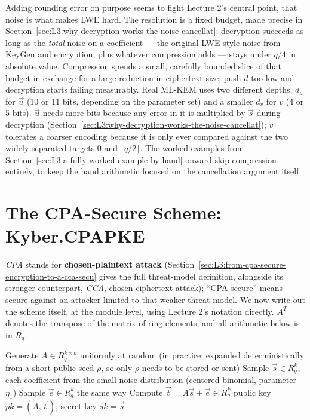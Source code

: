 Adding rounding error on purpose seems to fight Lecture 2's central point, that noise is what makes LWE hard. The resolution is a fixed budget, made precise in Section~\ref{sec:L3:why-decryption-works-the-noise-cancellat}: decryption succeeds as long as the \emph{total} noise on a coefficient --- the original LWE-style noise from KeyGen and encryption, plus whatever compression adds --- stays under $q/4$ in absolute value. Compression spends a small, carefully bounded slice of that budget in exchange for a large reduction in ciphertext size; push $d$ too low and decryption starts failing measurably. Real ML-KEM uses two different depths: $d_u$ for $\vec u$ (10 or 11 bits, depending on the parameter set) and a smaller $d_v$ for $v$ (4 or 5 bits). $\vec u$ needs more bits because any error in it is multiplied by $\vec s$ during decryption (Section~\ref{sec:L3:why-decryption-works-the-noise-cancellat}); $v$ tolerates a coarser encoding because it is only ever compared against the two widely separated targets $0$ and $\lceil q/2\rceil$. The worked examples from Section~\ref{sec:L3:a-fully-worked-example-by-hand} onward skip compression entirely, to keep the hand arithmetic focused on the cancellation argument itself.

\section{The CPA-Secure Scheme: Kyber.CPAPKE}
\label{sec:L3:the-cpa-secure-core-kyber-cpapke}

\emph{CPA} stands for \textbf{chosen-plaintext attack} (Section~\ref{sec:L3:from-cpa-secure-encryption-to-a-cca-secu} gives the full threat-model definition, alongside its stronger counterpart, \emph{CCA}, chosen-ciphertext attack); ``CPA-secure'' means secure against an attacker limited to that weaker threat model. We now write out the scheme itself, at the module level, using Lecture 2's notation directly. $A^T$ denotes the transpose of the matrix of ring elements, and all arithmetic below is in $R_q$.

\begin{algorithm}[ht]
\caption{Kyber.CPAPKE.KeyGen}
\begin{algorithmic}[1]
\State Generate $A \in R_q^{k\times k}$ uniformly at random (in practice: expanded deterministically from a short public seed $\rho$, so only $\rho$ needs to be stored or sent)
\State Sample $\vec s \in R_q^k$, each coefficient from the small noise distribution (centered binomial, parameter $\eta_1$)
\State Sample $\vec e \in R_q^k$ the same way
\State Compute $\vec t = A\vec s + \vec e \in R_q^k$
\State \Return public key $pk = (A, \vec t)$, secret key $sk = \vec s$
\end{algorithmic}
\end{algorithm}

